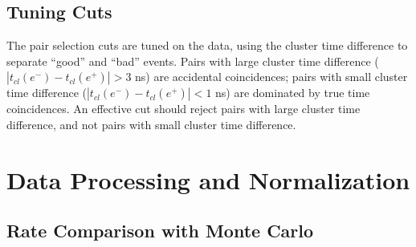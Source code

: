 \subsection{Tuning Cuts}
The pair selection cuts are tuned on the data, using the cluster time difference to separate ``good'' and ``bad'' events.
Pairs with large cluster time difference ($|t_{cl}(e^-)-t_{cl}(e^+)|>3$ ns) are accidental coincidences; pairs with small cluster time difference ($|t_{cl}(e^-)-t_{cl}(e^+)|<1$ ns) are dominated by true time coincidences.
An effective cut should reject pairs with large cluster time difference, and not pairs with small cluster time difference.


\section{Data Processing and Normalization}
\label{sec:luminosity}


\subsection{Rate Comparison with Monte Carlo}
\label{sec:rates}
